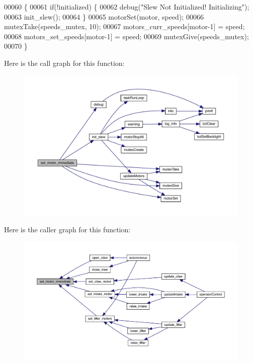 \begin{DoxyCode}
00060                                                \{
00061   \textcolor{keywordflow}{if}(!initialized) \{
00062     debug(\textcolor{stringliteral}{"Slew Not Initialized! Initializing"});
00063     init_slew();
00064   \}
00065   motorSet(motor, speed);
00066   mutexTake(speeds_mutex, 10);
00067   motors_curr_speeds[motor-1] = speed;
00068   motors_set_speeds[motor-1] = speed;
00069   mutexGive(speeds_mutex);
00070 \}
\end{DoxyCode}
Here is the call graph for this function\+:\nopagebreak
\begin{figure}[H]
\begin{center}
\leavevmode
\includegraphics[width=350pt]{slew_8c_a9f8b8ae577ef938622024545711f0151_cgraph}
\end{center}
\end{figure}
Here is the caller graph for this function\+:\nopagebreak
\begin{figure}[H]
\begin{center}
\leavevmode
\includegraphics[width=350pt]{slew_8c_a9f8b8ae577ef938622024545711f0151_icgraph}
\end{center}
\end{figure}
\mbox{\label{slew_8c_a7dff2b79dffe55fb936d977594d7c01d}} 
